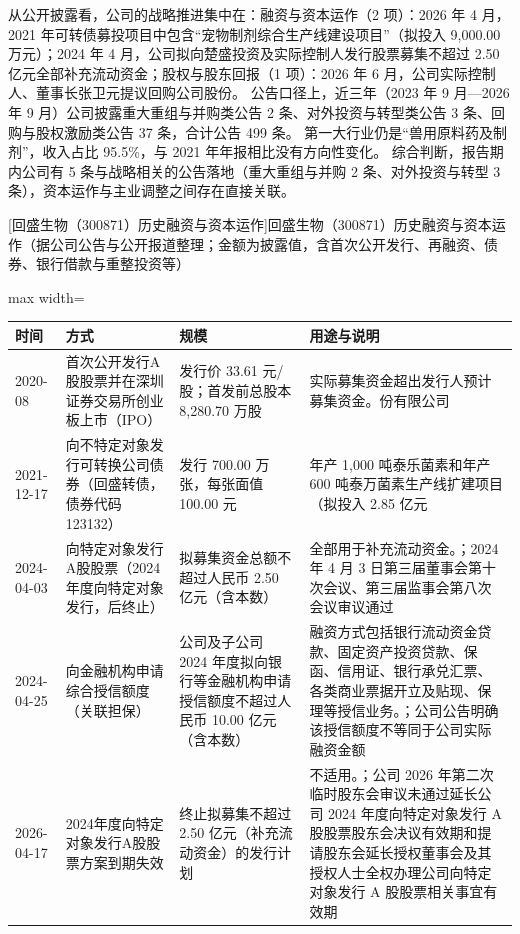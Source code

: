  从公开披露看，公司的战略推进集中在：融资与资本运作（2 项）：2026 年 4 月，2021 年可转债募投项目中包含“宠物制剂综合生产线建设项目”（拟投入 9,000.00 万元）；2024 年 4 月，公司拟向楚盛投资及实际控制人发行股票募集不超过 2.50 亿元全部补充流动资金；股权与股东回报（1 项）：2026 年 6 月，公司实际控制人、董事长张卫元提议回购公司股份。 公告口径上，近三年（2023 年 9 月---2026 年 9 月）公司披露重大重组与并购类公告 2 条、对外投资与转型类公告 3 条、回购与股权激励类公告 37 条，合计公告 499 条。 第一大行业仍是“兽用原料药及制剂”，收入占比 95.5\%，与 2021 年年报相比没有方向性变化。 综合判断，报告期内公司有 5 条与战略相关的公告落地（重大重组与并购 2 条、对外投资与转型 3 条），资本运作与主业调整之间存在直接关联。

\begin{center}\small\setlength{\tabcolsep}{4pt}
[回盛生物（300871）历史融资与资本运作]{回盛生物（300871）历史融资与资本运作（据公司公告与公开报道整理；金额为披露值，含首次公开发行、再融资、债券、银行借款与重整投资等）}
\begin{adjustbox}{max width=\textwidth}
\begin{tabular}{@{}p{1.45cm}p{2.55cm}p{4.05cm}p{4.95cm}@{}}
\toprule
时间 & 方式 & 规模 & 用途与说明 \\
\midrule
2020-08 & 首次公开发行A股股票并在深圳证券交易所创业板上市（IPO） & 发行价 33.61 元/\allowbreak{}股；首发前总股本 8,\allowbreak{}280.70 万股 & 实际募集资金超出发行人预计募集资金。份有限公司 \\
2021-12-17 & 向不特定对象发行可转换公司债券（回盛转债，债券代码123132） & 发行 700.00 万张，\allowbreak{}每张面值 100.00 元 & 年产 1,\allowbreak{}000 吨泰乐菌素和年产 600 吨泰万菌素生产线扩建项目（拟投入 2.85 亿元 \\
2024-04-03 & 向特定对象发行A股股票（2024年度向特定对象发行，后终止） & 拟募集资金总额不超过人民币 2.50 亿元（含本数） & 全部用于补充流动资金。；2024 年 4 月 3 日第三届董事会第十次会议、\allowbreak{}第三届监事会第八次会议审议通过 \\
2024-04-25 & 向金融机构申请综合授信额度（关联担保） & 公司及子公司 2024 年度拟向银行等金融机构申请授信额度不超过人民币 10.00 亿元（含本数） & 融资方式包括银行流动资金贷款、\allowbreak{}固定资产投资贷款、\allowbreak{}保函、\allowbreak{}信用证、\allowbreak{}银行承兑汇票、\allowbreak{}各类商业票据开立及贴现、\allowbreak{}保理等授信业务。；公司公告明确该授信额度不等同于公司实际融资金额 \\
2026-04-17 & 2024年度向特定对象发行A股股票方案到期失效 & 终止拟募集不超过 2.50 亿元（补充流动资金）的发行计划 & 不适用。；公司 2026 年第二次临时股东会审议未通过延长公司 2024 年度向特定对象发行 A 股股票股东会决议有效期和提请股东会延长授权董事会及其授权人士全权办理公司向特定对象发行 A 股股票相关事宜有效期 \\

\end{tabular}
\end{adjustbox}
\end{center}
